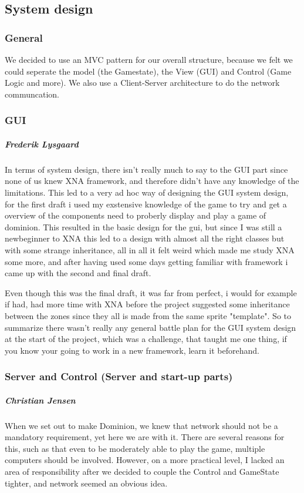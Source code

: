 \subsection{System design}
\subsubsection{General}
We decided to use an MVC pattern for our overall structure, because we felt we could seperate the model (the Gamestate), the View (GUI) and Control (Game Logic and more). We also use a Client-Server architecture to do the network communcation.

\subsubsection{GUI}
\subparagraph{Frederik Lysgaard}
In terms of system design, there isn't really much to say to the GUI part since none of us knew XNA framework, and therefore didn't have any knowledge of the limitations.
 This led to a very ad hoc way of designing the GUI system design, for the first draft i used my exstensive knowledge of the game to try and get a overview of the components need to proberly display and play a game of dominion. 
This resulted in the basic design for the gui, but since I was still a newbeginner to XNA this led to a design with almost all the right classes but with some strange inheritance, all in all it felt weird which made me study XNA some more, and after having used some days getting familiar with framework i came up with the second and final draft.

Even though this was the final draft, it was far from perfect, i would for example if had, had more time with XNA before the project suggested some inheritance between the zones since they all is made from the same sprite "template". So to summarize there wasn't really any general battle plan for the GUI system design at the start of the project, which was a challenge, that taught me one thing,
if you know your going to work in a new framework, learn it beforehand.
  
\subsubsection{Server and Control (Server and start-up parts)}
\subparagraph{Christian Jensen}
When we set out to make Dominion, we knew that network should not be a mandatory requirement, yet here we are with it.
There are several reasons for this, such as that even to be moderately able to play the game, multiple computers should be involved.
However, on a more practical level, I lacked an area of responsibility after we decided to couple the Control and GameState tighter, and network
seemed an obvious idea.

